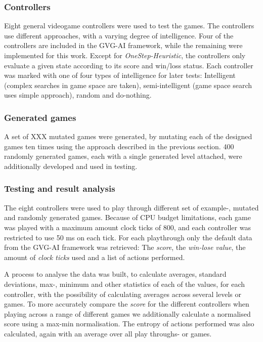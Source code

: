 \documentclass[a4paper,titlepage,final]{report}
\begin{document}
\subsubsection*{Controllers}
Eight general videogame controllers were used to test the games. The controllers use different approaches, with a varying degree of intelligence. Four of the controllers are included in the GVG-AI framework, while the remaining were implemented for this work. Except for \emph{OneStep-Heuristic}, the controllers only evaluate a given state according to its score and win/loss status.
Each controller was marked with one of four types of intelligence for later tests: Intelligent (complex searches in game space are taken), semi-intelligent (game space search uses simple approach), random and do-nothing.


\subsubsection*{Generated games}
A set of XXX mutated games were generated, by mutating each of the designed games ten times using the approach described in the previous section.
400 randomly generated games, each with a single generated level attached, were additionally developed and used in testing.

\subsubsection*{Testing and result analysis}
The eight controllers were used to play through different set of example-, mutated and randomly generated games. Because of CPU budget limitations, each game was played with a maximum amount clock ticks of 800, and each controller was restricted to use 50 ms on each tick. 
For each playthrough only the default data from the GVG-AI framework was retrieved: The \textit{score}, the \textit{win-lose value}, the amount of \textit{clock ticks} used and a list of actions performed.



A process to analyse the data was built, to calculate averages, standard deviations, max-, minimum and other statistics of each of the values, for each controller, with the possibility of calculating averages across several levels or games.
To more accurately compare the \textit{score} for the different controllers when playing across a range of different games  we additionally calculate a normalised score using a max-min normalisation. 
The entropy of actions performed was also calculated, again with an average over all play throughs- or games.
\end{document}
